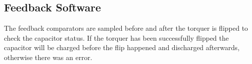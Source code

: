 
\subsection{Feedback Software}

The feedback comparators are sampled before and after the torquer is flipped to check the capacitor status. If the torquer has been successfully flipped the capacitor will be charged before the flip happened and discharged afterwards, otherwise there was an error. 


